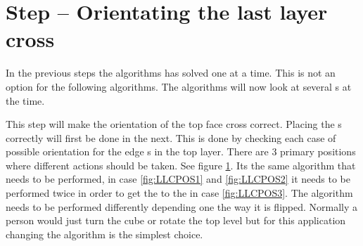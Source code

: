 \section{Step -- Orientating the last layer cross}
In the previous steps the algorithms has solved one \cpiece{} at a time. This is not an option for the following algorithms. The algorithms will now look at several \cpiece{}s at the time. 

This step will make the orientation of the top face cross correct. Placing the \cpiece{}s correctly will first be done in the next. This is done by checking each case of possible orientation for the edge \cpiece{}s in the top layer. There are 3 primary positions where different actions should be taken. See figure \ref{fig:LLCPOS}. Its the same algorithm that needs to be performed, in case \ref{fig:LLCPOS1} and \ref{fig:LLCPOS2} it needs to be performed twice in order to get the to the in case \ref{fig:LLCPOS3}. The algorithm needs to be performed differently depending one the way it is flipped. Normally a person would just turn the cube or rotate the top level but for this application changing the algorithm is the simplest choice. 

\begin{figure}[htb]
	\centering
		\hspace{0.02\textwidth}
		\hspace{0.02\textwidth}
		\caption{}
		\label{fig:LLCPOS}
\end{figure}


